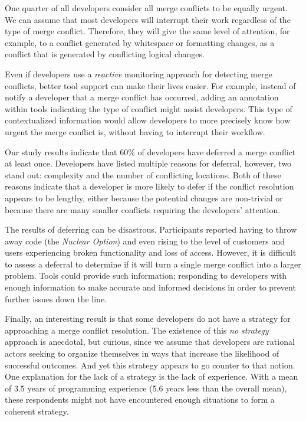 One quarter of all developers consider all merge conflicts to be equally urgent.
We can assume that most developers will interrupt their work regardless of the type of merge conflict.
Therefore, they will give the same level of attention, for example, to a conflict generated by whitespace or formatting changes, as a conflict that is generated by conflicting logical changes. 

Even if developers use a \emph{reactive} monitoring approach for detecting merge conflicts, better tool support can make their lives easier.
For example, instead of notify a developer that a merge conflict has occurred, adding an annotation within tools indicating the type of conflict might assist developers.
This type of contextualized information would allow developers to more precisely know how urgent the merge conflict is, without having to interrupt their workflow.

Our study results indicate that 60\% of developers have deferred a merge conflict at least once. 
Developers have listed multiple reasons for deferral, however, two stand out: complexity and the number of conflicting locations.
Both of these reasons indicate that a developer is more likely to defer if the conflict resolution appears to be lengthy, either because the potential changes are non-trivial or because there are many smaller conflicts requiring the developers' attention.

The results of deferring can be disastrous. 
Participants reported having to throw away code (the \emph{Nuclear Option}) and even rising to the level of
customers and users experiencing broken functionality and loss of access.
However, it is difficult to assess a deferral to determine if it will turn a single merge conflict into a larger problem.
Tools could provide such information; responding to developers with enough information to make accurate and informed decisions in order to prevent further issues down the line.

Finally, an interesting result is that some developers do not have a strategy for approaching a merge conflict resolution.
The existence of this \textit{no strategy} approach is anecdotal, but curious, since we assume that developers are rational actors seeking to organize themselves in ways that increase the likelihood of successful outcomes.
And yet this strategy appears to go counter to that notion.
One explanation for the lack of a strategy is the lack of experience.
With a mean of 3.5 years of programming experience (5.6 years less than the overall mean), these respondents might not have encountered enough situations to form a coherent strategy.

